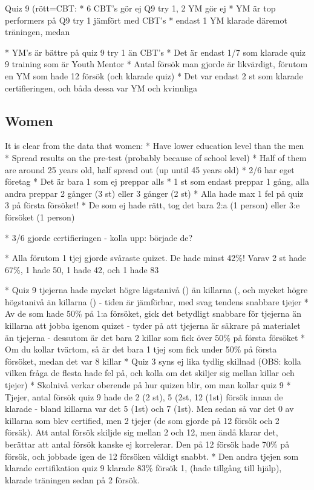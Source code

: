 Quiz 9 (rött=CBT:
* 6 CBT's gör ej Q9 try 1, 2 YM gör ej
* YM är top performers på Q9 try 1 jämfört med CBT's
* endast 1 YM klarade däremot träningen, medan

* YM's är bättre på quiz 9 try 1 än CBT's
* Det är endast 1/7 som klarade quiz 9 training som är Youth Mentor
* Antal försök man gjorde är likvärdigt, förutom en YM som hade 12 försök (och klarade quiz)
* Det var endast 2 st som klarade certifieringen, och båda dessa var YM och kvinnliga

\subsection{Women}

It is clear from the data that women:
* Have lower education level than the men
* Spread results on the pre-test (probably because of school level)
* Half of them are around 25 years old, half spread out (up until 45 years old)
* 2/6 har eget företag
* Det är bara 1 som ej preppar alls
* 1 st som endast preppar 1 gång, alla andra preppar 2 gånger (3 st) eller 3 gånger (2 st)
* Alla hade max 1 fel på quiz 3 på första försöket!
* De som ej hade rätt, tog det bara 2:a (1 person) eller 3:e försöket (1 person)

* 3/6 gjorde certifieringen - kolla upp: började de?

* Alla förutom 1 tjej gjorde svåraste quizet. De hade minst 42\%! Varav 2 st hade 67\%, 1 hade 50, 1 hade 42, och 1 hade 83

* Quiz 9 tjejerna hade mycket högre lägstanivå () än killarna (, och mycket högre högstanivå än killarna () - tiden är jämförbar, med svag tendens snabbare tjejer
* Av de som hade 50\% på 1:a försöket, gick det betydligt snabbare för tjejerna än killarna att jobba igenom quizet - tyder på att tjejerna är säkrare på materialet än tjejerna - dessutom är det bara 2 killar som fick över 50\% på första försöket
* Om du kollar tvärtom, så är det bara 1 tjej som fick under 50\% på första försöket, medan det var 8 killar
* Quiz 3 syns ej lika tydlig skillnad (OBS: kolla vilken fråga de flesta hade fel på, och kolla om det skiljer sig mellan killar och tjejer)
* Skolnivå verkar oberende på hur quizen blir, om man kollar quiz 9
* Tjejer, antal försök quiz 9 hade de 2 (2 st), 5 (2st, 12 (1st) försök innan de klarade - bland killarna var det 5 (1st) och 7 (1st). Men sedan så var det 0 av killarna som blev certified, men 2 tjejer (de som gjorde på 12 försök och 2 försäk). Att antal försök skiljde sig mellan 2 och 12, men ändå klarar det, berättar att antal försök kanske ej korrelerar. Den på 12 försök hade 70\% på försök, och jobbade igen de 12 försöken väldigt snabbt.
* Den andra tjejen som klarade certifikation quiz 9 klarade 83\% försök 1, (hade tillgång till hjälp), klarade träningen sedan på 2 försök.

